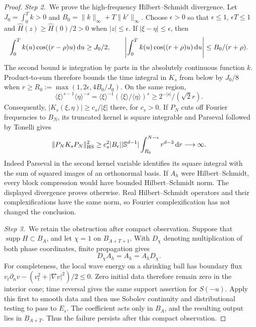 \begin{proof}
  \medskip
  \noindent\textit{Step 2.~}We prove the high-frequency Hilbert--Schmidt
  divergence.
  Let $J_0=\int_0^T k>0$ and
  $B_0=\|k\|_\infty+T\|k'\|_\infty$. Choose $\epsilon>0$ so that
  $\epsilon\le1$, $\epsilon T\le1$ and
  $\widehat H(z)\ge\widehat H(0)/2>0$ when $|z|\le\epsilon$.
  If $|\xi-\eta|\le\epsilon$, then
  \[
    \int_0^T k(u)\cos((r-\rho)u)\,\mathrm{d} u\ge J_0/2,
    \qquad
    \left|\int_0^T k(u)\cos((r+\rho)u)\,\mathrm{d} u\right|
    \le B_0/(r+\rho).
  \]
  The second bound is integration by parts in the absolutely continuous
  function $k$. Product-to-sum therefore bounds the time integral in $K_s$
  from below by $J_0/8$ when
  $r\ge R_0:=\max(1,2\epsilon,4B_0/J_0)$.
  On the same region,
  \[
    \langle\xi\rangle^{s-1}\langle\eta\rangle^{-s}
    =\langle\xi\rangle^{-1}
    (\langle\xi\rangle/\langle\eta\rangle)^s
    \ge 2^{-|s|}/(\sqrt2 r).
  \]
  Consequently, $|K_s(\xi,\eta)|\ge c_s/|\xi|$ there, for $c_s>0$.
  If $P_N$ cuts off Fourier frequencies to $B_N$, its truncated kernel is
  square integrable and Parseval followed by Tonelli gives
  \[
    \|P_NK_sP_N\|_{\operatorname{HS}}^2
    \ge c_s^2|B_\epsilon||\mathbb S^{d-1}|
    \int_{R_0}^{N-\epsilon}r^{d-3}\,\mathrm{d} r\longrightarrow\infty.
  \]
  Indeed Parseval in the second kernel variable identifies its square integral
  with the sum of squared images of an orthonormal basis. If $A_h$ were
  Hilbert--Schmidt, every block compression would have bounded
  Hilbert--Schmidt norm. The displayed divergence proves otherwise. Real
  Hilbert--Schmidt operators and their complexifications have the same norm,
  so Fourier complexification has not changed the conclusion.


  \medskip
  \noindent\textit{Step 3.~}We retain the obstruction after compact
  observation.
  Suppose that $\operatorname{supp}H\subset B_A$, and let $\chi=1$ on
  $B_{A+T+1}$. With $D_\chi$ denoting multiplication of both phase coordinates,
  finite propagation gives
  \[
    D_\chi A_h=A_h=A_hD_\chi.
  \]
  For completeness, the local wave energy on a shrinking ball has boundary
  flux $v_t\partial_n v-(v_t^2+|\nabla v|^2)/2\le0$. Zero initial data
  therefore remain zero in the interior cone; time reversal gives the same
  support assertion for $S(-u)$. Apply this first to smooth data and then use
  Sobolev continuity and distributional testing to pass to $E_s$. The
  coefficient acts only in $B_A$, and the resulting output lies in
  $B_{A+T}$. Thus the failure persists after this compact observation.



\end{proof}

